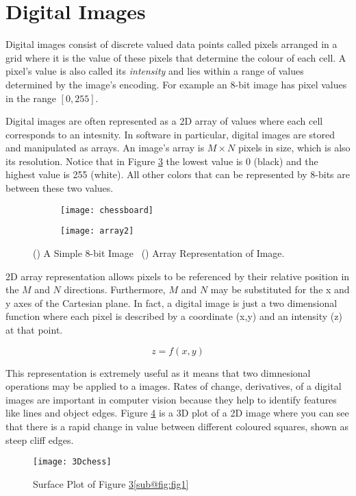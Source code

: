 \section{Digital Images}
Digital images consist of discrete valued data points called pixels arranged in a grid where it is the value of these pixels that determine the colour of each cell. A pixel's value is also called its \emph{intensity} and lies within a range of values determined by the image's encoding. For example an 8-bit image has pixel values in the range $[0, 255]$. 

Digital images are often represented as a 2D array of values where each cell corresponds to an intesnity. In software in particular,  digital images are stored and manipulated as arrays. An image's array is $M\times N$ pixels in size, which is also its resolution. Notice that in Figure \ref{fig:2Darray} the lowest value is 0 (black) and the highest value is 255 (white). All other colors that can be represented by 8-bits are between these two values.

\begin{figure}[H]
    \centering
    \begin{subfigure}[b]{0.5\linewidth}
      \centering\texttt{[image: chessboard]}
      \caption{\label{fig:fig1}}
    \end{subfigure}%
    \begin{subfigure}[b]{0.5\linewidth}
      \centering\texttt{[image: array2]}
      \caption{\label{fig:fig2}}
    \end{subfigure}
    \caption{() A Simple 8-bit Image ~() Array Representation of Image.}
    \label{fig:2Darray}
\end{figure}
  

2D array representation allows pixels to be referenced by their relative position in the $M$ and $N$ directions. Furthermore, $M$ and $N$ may be substituted for the x and y axes of the Cartesian plane. In fact, a digital image is just a two dimensional function where each pixel is described by a coordinate (x,y) and an intensity (z) at that point.

\begin{equation}
    z = f(x,y)
    \label{eq:2Dfunc}
\end{equation}

This representation is extremely useful as it means that two dimnesional operations may be applied to a images. Rates of change, derivatives, of a digital images are important in computer vision because they help to identify features like lines and object edges. Figure \ref{fig:3Dplot} is a 3D plot of a 2D image where you can see that there is a rapid change in value between different coloured squares, shown as steep cliff edges. 

\begin{figure}[ht!]
  \centering
  \centering\texttt{[image: 3Dchess]}
  \caption{\label{fig:fig1} Surface Plot of Figure \ref{fig:2Darray}\ref{sub@fig:fig1}}
  \label{fig:3Dplot}
\end{figure}






